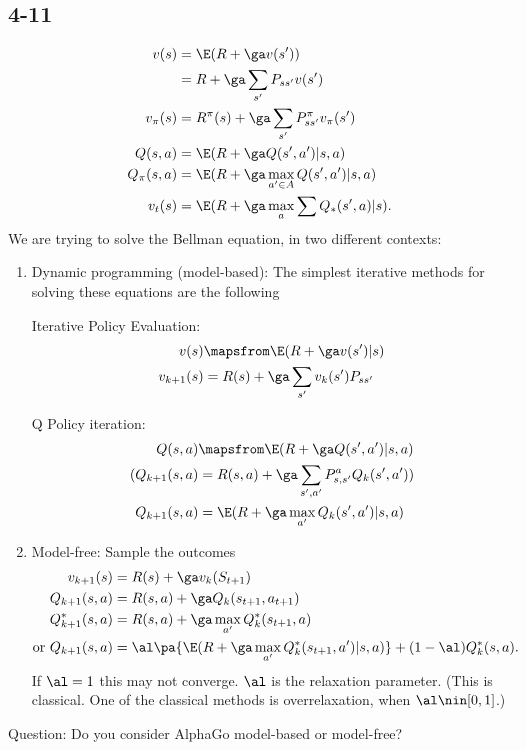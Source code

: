 \subsection{4-11}


\begin{align}
v(s) &= \E(R+\ga v(s'))\\
&=R+\ga \sum_{s'} P_{ss'} v(s')\\
v_\pi(s) &= R^\pi(s) + \ga \sum_{s'} P_{ss'}^\pi v_\pi(s')\\
Q(s,a) &= \E(R+\ga Q(s',a')|s,a)\\
Q_\pi(s,a) &= \E(R+\ga \max_{a'\in A}Q(s',a')|s,a)\\
v_t(s) &= \E(R+\ga \max_a \sum Q_*(s',a)|s).
\end{align}
We are trying to solve the Bellman equation, in two different contexts:
\begin{enumerate}
\item
Dynamic programming (model-based): The simplest iterative methods for solving these equations are the following

Iterative Policy Evaluation:
\begin{align}
v(s)&\mapsfrom \E(R+\ga v(s')|s)\\
v_{k+1}(s)&=R(s) + \ga \sum_{s'} v_k(s') P_{ss'}
\end{align}

Q Policy iteration: %
\begin{align}
Q(s,a) &\mapsfrom \E(R+\ga Q(s',a')|s,a)\\
(Q_{k+1}(s,a) &=R(s,a) + \ga \sum_{s',a'} P_{s,s'}^a Q_k(s',a'))\\
Q_{k+1}(s,a)&=\E(R+\ga \max_{a'} Q_k(s',a')|s,a)
\end{align}
\item
Model-free: Sample the outcomes
\begin{align}
v_{k+1}(s) &= R(s) + \ga v_k(S_{t+1})\\
Q_{k+1}(s,a) &= R(s,a) + \ga Q_k(s_{t+1},a_{t+1})\\
Q_{k+1}^*(s,a) &= R(s,a) + \ga \max_{a'} Q_k^*(s_{t+1},a)\\
\text{or }
Q_{k+1}(s,a)&=\al\pa{\E(R+\ga \max_{a'} Q_k^*(s_{t+1},a')|s,a)}+(1-\al)Q_k^*(s,a).
\end{align}
If $\al=1$ this may not converge. $\al$ is the relaxation parameter.
(This is classical. One of the classical methods is overrelaxation, when $\al\nin [0,1]$.)
\end{enumerate}
Question: Do you consider AlphaGo model-based or model-free?

